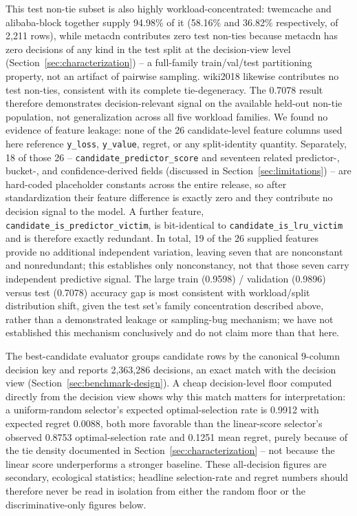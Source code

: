 \begin{sloppypar}
This test non-tie subset is also highly workload-concentrated: twemcache
and alibaba-block together supply 94.98\% of it (58.16\% and 36.82\%
respectively, of 2,211 rows), while metacdn contributes zero test
non-ties because metacdn has zero decisions of any kind in the test
split at the decision-view level (Section~\ref{sec:characterization}) --
a full-family train/val/test partitioning property, not an artifact of
pairwise sampling. wiki2018 likewise contributes no test non-ties,
consistent with its complete tie-degeneracy. The 0.7078 result therefore
demonstrates decision-relevant signal on the available held-out non-tie
population, not generalization across all five workload families. We
found no evidence of feature leakage: none of the 26 candidate-level
feature columns used here reference \texttt{y\_loss}, \texttt{y\_value},
regret, or any split-identity quantity. Separately, 18 of those 26 --
\texttt{candidate\_predictor\_score} and seventeen related predictor-,
bucket-, and confidence-derived fields (discussed in
Section~\ref{sec:limitations}) -- are hard-coded placeholder constants
across the entire release, so after standardization their feature
difference is exactly zero and they contribute no decision signal to
the model. A further feature, \texttt{candidate\_is\_predictor\_victim},
is bit-identical to \texttt{candidate\_is\_lru\_victim} and is therefore
exactly redundant. In total, 19 of the 26 supplied features provide no
additional independent variation, leaving seven that are nonconstant
and nonredundant; this establishes only nonconstancy, not that those
seven carry independent predictive signal.
The large train (0.9598) / validation (0.9896) versus test (0.7078)
accuracy gap is most consistent with workload/split distribution shift,
given the test set's family concentration described above, rather than a
demonstrated leakage or sampling-bug mechanism; we have not established
this mechanism conclusively and do not claim more than that here.
\end{sloppypar}

The best-candidate evaluator groups candidate rows by the canonical
9-column decision key and reports 2,363,286 decisions, an exact match
with the decision view (Section~\ref{sec:benchmark-design}). A cheap
decision-level floor computed directly from the decision view shows why
this match matters for interpretation: a uniform-random selector's
expected optimal-selection rate is 0.9912 with expected regret 0.0088,
both more favorable than the linear-score selector's observed 0.8753
optimal-selection rate and 0.1251 mean regret, purely because of the tie
density documented in Section~\ref{sec:characterization} -- not because
the linear score underperforms a stronger baseline. These all-decision
figures are secondary, ecological statistics; headline selection-rate
and regret numbers should therefore never be read in isolation from
either the random floor or the discriminative-only figures below.

